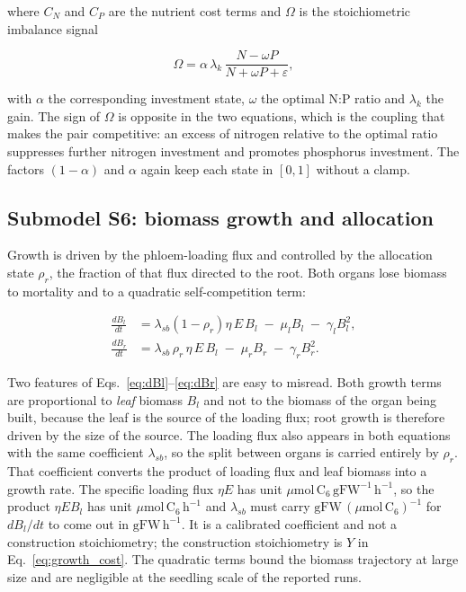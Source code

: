 where $C_N$ and $C_P$ are the nutrient cost terms and $\Omega$ is the
stoichiometric imbalance signal

\begin{equation}
\Omega = \alpha\,\lambda_k\,\frac{N - \omega P}{N + \omega P + \varepsilon},
\label{eq:imbalance}
\end{equation}

with $\alpha$ the corresponding investment state, $\omega$ the optimal N:P ratio
and $\lambda_k$ the gain. The sign of $\Omega$ is opposite in the two equations,
which is the coupling that makes the pair competitive: an excess of nitrogen
relative to the optimal ratio suppresses further nitrogen investment and
promotes phosphorus investment. The factors $(1-\alpha)$ and $\alpha$ again keep
each state in $[0,1]$ without a clamp.

\subsection{Submodel S6: biomass growth and allocation}
\label{sec:allocation}

Growth is driven by the phloem-loading flux and controlled by the allocation
state $\rho_r$, the fraction of that flux directed to the root. Both organs
lose biomass to mortality and to a quadratic self-competition term:

\begin{align}
\frac{dB_l}{dt}
&= \lambda_{sb}\left(1-\rho_r\right)\eta\,E\,B_l
\;-\; \mu_l B_l \;-\; \gamma_l B_l^{2},
\label{eq:dBl}\\[3pt]
\frac{dB_r}{dt}
&= \lambda_{sb}\,\rho_r\,\eta\,E\,B_l
\;-\; \mu_r B_r \;-\; \gamma_r B_r^{2}.
\label{eq:dBr}
\end{align}

Two features of Eqs.~\eqref{eq:dBl}--\eqref{eq:dBr} are easy to misread. Both
growth terms are proportional to \emph{leaf} biomass $B_l$ and not to the
biomass of the organ being built, because the leaf is the source of the loading
flux; root growth is therefore driven by the size of the source. The loading flux
also appears in both equations with the same coefficient $\lambda_{sb}$, so the
split between organs is carried entirely by $\rho_r$. That coefficient converts
the product of loading flux and leaf biomass into a growth rate. The specific
loading flux $\eta E$ has unit $\mu\mathrm{mol\,C_6\,gFW^{-1}\,h^{-1}}$, so the
product $\eta E B_l$ has unit $\mu\mathrm{mol\,C_6\,h^{-1}}$ and
$\lambda_{sb}$ must carry $\mathrm{gFW}\,(\mu\mathrm{mol\,C_6})^{-1}$ for
$dB_l/dt$ to come out in $\mathrm{gFW\,h^{-1}}$. It is a calibrated
coefficient and not a construction stoichiometry; the construction stoichiometry
is $Y$ in Eq.~\eqref{eq:growth_cost}. The quadratic terms bound the biomass
trajectory at large size and are negligible at the seedling scale of the reported
runs.

